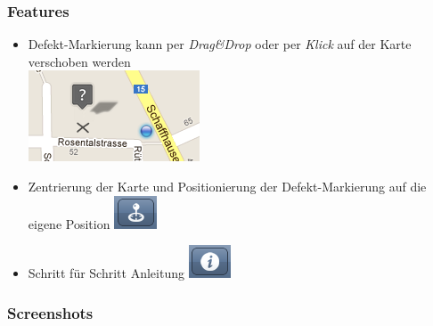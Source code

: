 \subsubsection{Features}
\begin{itemize}
\item Defekt-Markierung kann per \emph{Drag\&Drop} oder per \emph{Klick} auf der Karte verschoben werden \\ \includegraphics{images/usecase2-fixmystreet/features/features-report-drag_and_drop}
\item Zentrierung der Karte und Positionierung der Defekt-Markierung auf die eigene Position \includegraphics{images/usecase2-fixmystreet/features/features-report-center_map_button}
\item Schritt für Schritt Anleitung \includegraphics{images/usecase2-fixmystreet/features/features-report-info_button}
\end{itemize}

\subsubsection{Screenshots}

